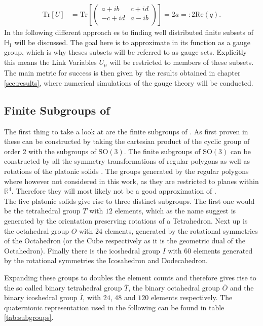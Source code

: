 \begin{align*}
 \mathrm{Tr}\left[ U \right] & = \mathrm{Tr}\left[ \begin{pmatrix}
   a + ib  & c + id \\
   -c + id & a - ib \\
  \end{pmatrix} \right] = 2 a = : 2 \mathrm{Re} (q) \textrm{.}
\end{align*}
In the following different approach es to finding well distributed finite subsets of $\mathbb{H}_1$ will be discussed. The goal here is to approximate \SUTwo in its function as a gauge group, which is why theses subsets will be referred to as gauge sets. Explicitly this means the Link Variables $U_\mu$ will be restricted to members of these subsets. The main metric for success is then given by the results obtained in chapter \ref{sec:results}, where numerical simulations of the gauge theory will be conducted.

\subsection{Finite Subgroups of \SUTwo}

The first thing to take a look at are the finite subgroups of \SUTwo. As first proven in \cite{findsource} these can be constructed by taking the cartesian product of the cyclic group of order 2 with the subgroups of $\mathrm{SO}(3)$. The finite subgroups of $\mathrm{SO}(3)$ can be constructed by all the symmetry transformations of regular polygons as well as rotations of the platonic solids \cite{findsource}. The groups generated by the regular polygons where however not considered in this work, as they are restricted to planes within $\mathbb{R}^4$. Therefore they will most likely not be a good approximation of \SUTwo.\\

The five platonic solids give rise to three distinct subgroups. The first one would be the tetrahedral group $T$ with $12$ elements, which as the name suggest is generated by the orientation preserving rotations of a Tetrahedron. Next up is the octahedral group $O$ with $24$ elements, generated by the rotational symmetries of the Octahedron (or the Cube respectively as it is the geometric dual of the Octahedron). Finally there is the icoshedral group $I$ with $60$ elements generated by the rotational symmetries the Icosahedron and Dodecahedron.

Expanding these groups to \SUTwo doubles the element counts and therefore gives rise to the so called binary tetrahedral group $\overline{T}$, the binary octahedral group $\overline{O}$ and the binary icoshedral group $\overline{I}$, with $24$, $48$ and $120$ elements respectively. The quaternionic representation used in the following can be found in table \ref{tab:subgroups}.

